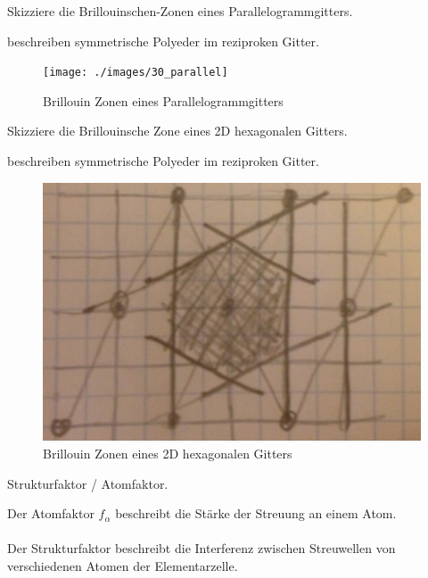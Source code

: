 \documentclass[a5paper,12pt,ngerman,grid=front %
,print
]{kartei}
\begin{document}
	\begin{karte}{
		Skizziere die Brillouinschen-Zonen eines Parallelogrammgitters.
		}
		
		beschreiben symmetrische Polyeder im reziproken Gitter.
		
		\begin{figure}[htbp]
			\centering
			\texttt{[image: ./images/30\_parallel]}
			\caption{Brillouin Zonen eines Parallelogrammgitters}
		\end{figure}
		
	\end{karte}


	\begin{karte}{
		Skizziere die Brillouinsche Zone eines 2D hexagonalen Gitters.
		}
		
		beschreiben symmetrische Polyeder im reziproken Gitter.
		
		\begin{figure}[htbp]
			\centering
			\includegraphics[width=0.45\linewidth]{./images/31_hex}
			\caption{Brillouin Zonen eines 2D hexagonalen Gitters}
		\end{figure}
		
	\end{karte}


	\begin{karte}{
		Strukturfaktor / Atomfaktor.
		}
		
		Der Atomfaktor $f_\alpha$ beschreibt die Stärke der Streuung an einem Atom. \\ \\
		
		Der Strukturfaktor beschreibt die Interferenz zwischen Streuwellen von verschiedenen Atomen der Elementarzelle.
		
	\end{karte}
\end{document}
